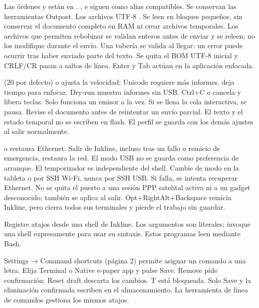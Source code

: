 Las órdenes  y  están en
. ,  e
 siguen como alias compatibles. Se conservan las herramientas Outpost.
\UsbExamples
Los archivos UTF-8 . Se leen en bloques
pequeños, sin conservar el documento completo en RAM ni crear archivos temporales.
Los archivos que permiten rebobinar se validan enteros antes de enviar y se releen;
no los modifique durante el envío. Una tubería se valida al llegar: un error puede
ocurrir tras haber enviado parte del texto. Se quita el BOM UTF-8 inicial y
CRLF/CR pasan a saltos de línea. Enter y Tab actúan en la aplicación enfocada.

 (20 por defecto) o  ajusta la velocidad; Unicode
requiere más informes.  deja tiempo para enfocar. Dry-run
muestra informes sin USB. Ctrl+C o  cancela y libera teclas.
Solo funciona un emisor a la vez. Si se llena la cola interactiva, se pausa.
Revise el documento antes de reintentar un envío parcial. El texto y el estado
temporal no se escriben en flash. El perfil se guarda con los demás ajustes al
salir normalmente.

 o  restaura Ethernet. Salir de Inkline,
incluso tras un fallo o reinicio de emergencia, restaura la red. El modo USB no
se guarda como preferencia de arranque.
\UsbRecoveryExample
El temporizador es independiente del shell. Cambie de modo en la tableta o por
SSH Wi-Fi, nunca por SSH USB. Si falla, se intenta recuperar Ethernet. No se
quita el puerto a una sesión PPP satelital activa ni a un gadget desconocido;
también se aplica al salir. Opt+RightAlt+Backspace reinicia Inkline, pero cierra
todos sus terminales y pierde el trabajo sin guardar.

Registre atajos desde una shell de Inkline. Los argumentos son literales;
invoque una shell expresamente para usar su sintaxis. Estos programas leen
 mediante Bash.

Settings → Command shortcuts (página 2) permite asignar un comando a una letra. Elija Terminal o Native e-paper app y pulse Save. Remove pide confirmación; Reset draft descarta los cambios. T está bloqueada. Solo Save y la eliminación confirmada escriben en el almacenamiento. La herramienta de línea de comandos gestiona los mismos atajos.

